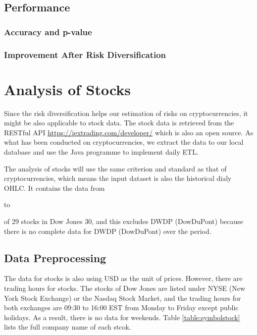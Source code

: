 \documentclass[11pt]{article} %
\theoremstyle{plain}
\theoremstyle{definition}
\begin{document}
\subsection{Performance}
\subsubsection{Accuracy and p-value}
\subsubsection{Improvement After Risk Diversification}

\section{Analysis of Stocks}

Since the risk diversification helps our estimation of risks on cryptocurrencies, it might be also applicable to stock data. The stock data is retrieved from the RESTful API \url{https://iextrading.com/developer/}\cite{iextrading} which is also an open source. As what has been conducted on cryptocurrencies, we extract the data to our local database and use the Java programme to implement daily ETL.

The analysis of stocks will use the same criterion and standard as that of cryptocurrencies, which means the input dataset is also the historical dialy OHLC. It contains the data from \date{1st January 2016} to \date{31st July 2018} of 29 stocks in Dow Jones 30, and this excludes DWDP (DowDuPont) because there is no complete data for DWDP (DowDuPont) over the period.

\subsection{Data Preprocessing}

The data for stocks is also using USD as the unit of prices. However, there are trading hours for stocks. The stocks of Dow Jones are listed under NYSE (New York Stock Exchange) or the Nasdaq Stock Market, and the trading hours for both exchanges are 09:30 to 16:00 EST from Monday to Friday except public holidays. As a result, there is no data for weekends. Table \ref{table:symbolstock} lists the full company name of each stcok.
\end{document}
